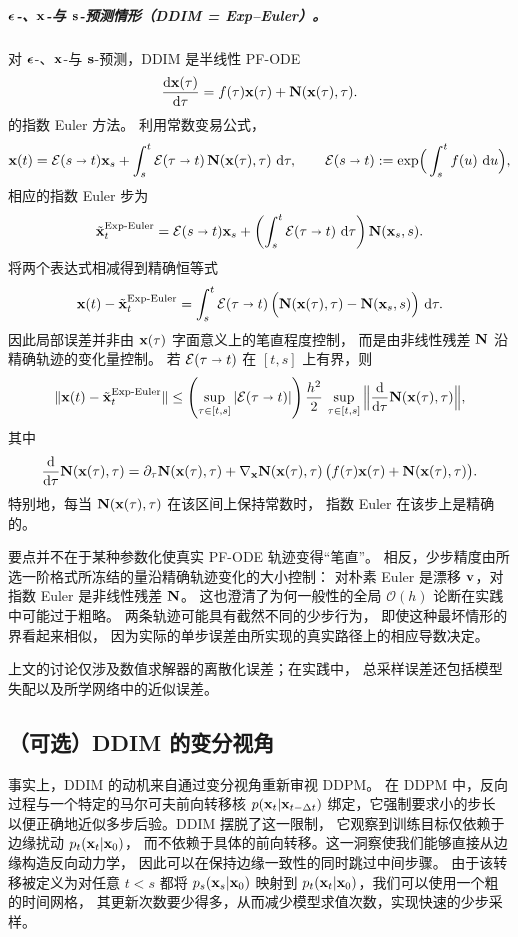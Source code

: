 \subparagraph{${\bm{\epsilon}}$-、${\mathbf{x}}$-与 ${\mathbf{s}}$-预测情形（DDIM = Exp--Euler）。}
对 ${\bm{\epsilon}}$-、${\mathbf{x}}$-与 ${\mathbf{s}}$-预测，DDIM 是半线性 PF-ODE
\[
\frac{\mathop{}\!\mathrm{d} {\mathbf{x}}(\tau)}{\mathop{}\!\mathrm{d} \tau}
=
f(\tau){\mathbf{x}}(\tau)+{\mathbf{N}}({\mathbf{x}}(\tau),\tau).
\]
的指数 Euler 方法。
利用常数变易公式，
\[
{\mathbf{x}}(t)
=
\mathcal E(s\shortrightarrow t){\mathbf{x}}_s
+
\int_s^t
\mathcal E(\tau\shortrightarrow t)\,
{\mathbf{N}}({\mathbf{x}}(\tau),\tau)\,\mathop{}\!\mathrm{d}\tau,
\qquad
\mathcal E(s\shortrightarrow t)
:=
\exp\!\Big(\int_s^t f(u)\,\mathop{}\!\mathrm{d} u\Big),
\]
相应的指数 Euler 步为
\[
\tilde{{\mathbf{x}}}_t^{\mathrm{Exp}\text{-}\mathrm{Euler}}
=
\mathcal E(s\shortrightarrow t){\mathbf{x}}_s
+
\left(\int_s^t \mathcal E(\tau\shortrightarrow t)\,\mathop{}\!\mathrm{d}\tau\right)
{\mathbf{N}}({\mathbf{x}}_s,s).
\]
将两个表达式相减得到精确恒等式
\[
{\mathbf{x}}(t)-\tilde{{\mathbf{x}}}_t^{\mathrm{Exp}\text{-}\mathrm{Euler}}
=
\int_s^t
\mathcal E(\tau\shortrightarrow t)\,
\Big(
{\mathbf{N}}({\mathbf{x}}(\tau),\tau)-{\mathbf{N}}({\mathbf{x}}_s,s)
\Big)\,\mathop{}\!\mathrm{d}\tau.
\]
因此局部误差并非由 ${\mathbf{x}}(\tau)$ 字面意义上的笔直程度控制，
而是由非线性残差 ${\mathbf{N}}$ 沿精确轨迹的变化量控制。
若 $\mathcal E(\tau\shortrightarrow t)$ 在 $[t,s]$ 上有界，则
\[
\|{\mathbf{x}}(t)-\tilde{{\mathbf{x}}}_t^{\mathrm{Exp}\text{-}\mathrm{Euler}}\|
\le
\left(\sup_{\tau\in[t,s]}|\mathcal E(\tau\shortrightarrow t)|\right)
\frac{h^2}{2}\,
\sup_{\tau\in[t,s]}
\Big\|
\frac{\mathop{}\!\mathrm{d}}{\mathop{}\!\mathrm{d} \tau}{\mathbf{N}}({\mathbf{x}}(\tau),\tau)
\Big\|,
\]
其中
\[
\frac{\mathop{}\!\mathrm{d}}{\mathop{}\!\mathrm{d} \tau}{\mathbf{N}}({\mathbf{x}}(\tau),\tau)
=
\partial_\tau {\mathbf{N}}({\mathbf{x}}(\tau),\tau)
+
\nabla_{{\mathbf{x}}}{\mathbf{N}}({\mathbf{x}}(\tau),\tau)\,
\bigl(f(\tau){\mathbf{x}}(\tau)+{\mathbf{N}}({\mathbf{x}}(\tau),\tau)\bigr).
\]
特别地，每当 ${\mathbf{N}}({\mathbf{x}}(\tau),\tau)$ 在该区间上保持常数时，
指数 Euler 在该步上是精确的。

要点并不在于某种参数化使真实 PF-ODE 轨迹变得“笔直”。
相反，少步精度由所选一阶格式所冻结的量沿精确轨迹变化的大小控制：
对朴素 Euler 是漂移 ${\mathbf{v}}$，对指数 Euler 是非线性残差 ${\mathbf{N}}$。
这也澄清了为何一般性的全局 $\mathcal O(h)$ 论断在实践中可能过于粗略。
两条轨迹可能具有截然不同的少步行为，
即使这种最坏情形的界看起来相似，
因为实际的单步误差由所实现的真实路径上的相应导数决定。

上文的讨论仅涉及数值求解器的离散化误差；在实践中，
总采样误差还包括模型失配以及所学网络中的近似误差。


\subsection{（可选）DDIM 的变分视角}\label{subsec:ddim}

事实上，DDIM 的动机来自通过变分视角重新审视 DDPM。
在 DDPM 中，反向过程与一个特定的马尔可夫前向转移核
$p({\mathbf{x}}_t|{\mathbf{x}}_{t-\Delta t})$ 绑定，它强制要求小的步长
以便正确地近似多步后验。DDIM 摆脱了这一限制，
它观察到训练目标仅依赖于边缘扰动 $p_t({\mathbf{x}}_t|{\mathbf{x}}_0)$，
而不依赖于具体的前向转移。这一洞察使我们能够直接从边缘构造反向动力学，
因此可以在保持边缘一致性的同时跳过中间步骤。
由于该转移被定义为对任意 $t<s$ 都将 $p_s({\mathbf{x}}_s|{\mathbf{x}}_0)$ 映射到
$p_t({\mathbf{x}}_t|{\mathbf{x}}_0)$，我们可以使用一个粗的时间网格，
其更新次数要少得多，从而减少模型求值次数，实现快速的少步采样。



